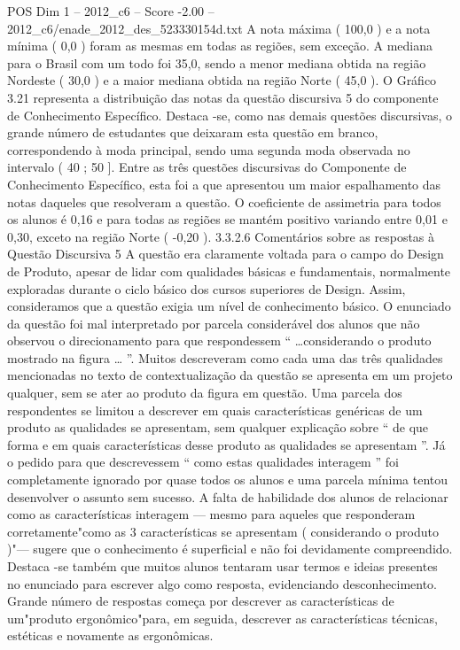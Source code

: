 \begin{textsample}{POS Dim 1 – 2012\_c6 – Score -2.00 – 2012\_c6/enade\_2012\_des\_523330154d.txt}
A nota máxima ( 100,0 ) e a nota mínima ( 0,0 ) foram as mesmas em todas as regiões, sem exceção.
A mediana para o Brasil com um todo foi 35,0, sendo a menor mediana obtida na região Nordeste ( 30,0 ) e a maior mediana obtida na região Norte ( 45,0 ).
O Gráfico 3.21 representa a distribuição das notas da questão discursiva 5 do componente de Conhecimento Específico.
Destaca -se, como nas demais questões discursivas, o grande número de estudantes que deixaram esta questão em branco, correspondendo à moda principal, sendo uma segunda moda observada no intervalo ( 40 ; 50 ].
Entre as três questões discursivas do Componente de Conhecimento Específico, esta foi a que apresentou um maior espalhamento das notas daqueles que resolveram a questão.
O coeficiente de assimetria para todos os alunos é 0,16 e para todas as regiões se mantém positivo variando entre 0,01 e 0,30, exceto na região Norte ( -0,20 ). 3.3.2.6 Comentários sobre as respostas à Questão Discursiva 5 A questão era claramente voltada para o campo do Design de Produto, apesar de lidar com qualidades básicas e fundamentais, normalmente exploradas durante o ciclo básico dos cursos superiores de Design.
Assim, consideramos que a questão exigia um nível de conhecimento básico.
O enunciado da questão foi mal interpretado por parcela considerável dos alunos que não observou o direcionamento para que respondessem “ …considerando o produto mostrado na figura … ”.
Muitos descreveram como cada uma das três qualidades mencionadas no texto de contextualização da questão se apresenta em um projeto qualquer, sem se ater ao produto da figura em questão.
Uma parcela dos respondentes se limitou a descrever em quais características genéricas de um produto as qualidades se apresentam, sem qualquer explicação sobre “ de que forma e em quais características desse produto as qualidades se apresentam ”.
Já o pedido para que descrevessem “ como estas qualidades interagem ” foi completamente ignorado por quase todos os alunos e uma parcela mínima tentou desenvolver o assunto sem sucesso.
A falta de habilidade dos alunos de relacionar como as características interagem — mesmo para aqueles que responderam corretamente"como as 3 características se apresentam ( considerando o produto )"— sugere que o conhecimento é superficial e não foi devidamente compreendido.
Destaca -se também que muitos alunos tentaram usar termos e ideias presentes no enunciado para escrever algo como resposta, evidenciando desconhecimento.
Grande número de respostas começa por descrever as características de um"produto ergonômico"para, em seguida, descrever as características técnicas, estéticas e novamente as ergonômicas.

\end{textsample}
